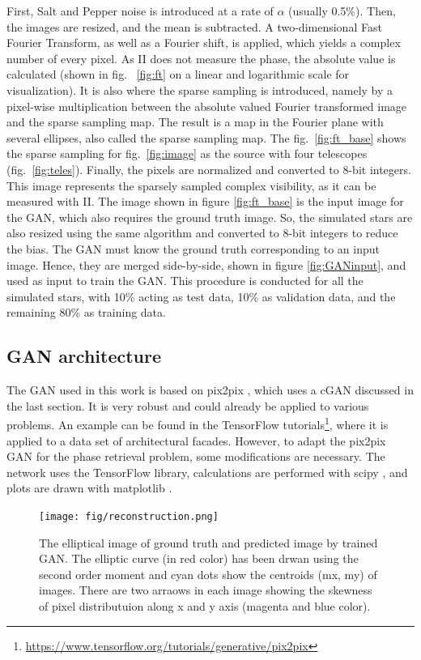 First, Salt and Pepper noise is introduced at a rate of $\alpha$ (usually 0.5\%). Then, the images are resized, and the mean is subtracted. A two-dimensional Fast Fourier Transform, as well as a Fourier shift, is applied, which yields a complex number of every pixel. As II does not measure the phase, the absolute value is calculated (shown in fig.~ \ref{fig:ft} on a linear and logarithmic scale for visualization). It is also where the sparse sampling is introduced, namely by a pixel-wise multiplication between the absolute valued Fourier transformed image and the sparse sampling map. The result is a map in the Fourier plane with several ellipses, also called the sparse sampling map. The fig.~\ref{fig:ft_base} shows the sparse sampling for fig.~\ref{fig:image} as the source with four telescopes (fig.~\ref{fig:teles}). Finally, the pixels are normalized and converted to 8-bit integers. This image represents the sparsely sampled complex visibility, as it can be measured with II. The image shown in figure \ref{fig:ft_base} is the input image for the GAN, which also requires the ground truth image. So, the simulated stars are also resized using the same algorithm and converted to 8-bit integers to reduce the bias. The GAN must know the ground truth corresponding to an input image. Hence, they are merged side-by-side, shown in figure \ref{fig:GANinput}, and used as input to train the GAN. This procedure is conducted for all the simulated stars, with 10\% acting as test data, 10\% as validation data, and the remaining 80\% as training data. 

\subsection{GAN architecture}
The GAN used in this work is based on pix2pix \cite{isola2017image}, which uses a cGAN discussed in the last section. It is very robust and could already be applied to various problems. An example can be found in the TensorFlow tutorials\footnote{\url{https://www.tensorflow.org/tutorials/generative/pix2pix}}, where it is applied to a data set of architectural facades. However, to adapt the pix2pix GAN for the phase retrieval problem, some modifications are necessary. The network uses the TensorFlow \cite{abadi2016tensorflow} library, calculations are performed with scipy \cite{virtanen2020scipy}, and plots are drawn with matplotlib \cite{4160265}.
\begin{figure}
	\texttt{[image: fig/reconstruction.png]}
	\caption{The elliptical image of ground truth and predicted image by trained GAN. The elliptic curve (in red color) has been drwan using the second order moment and cyan dots show the centroids (mx, my) of images. There are two arraows in each image showing the skewness of pixel distributuion along x and y axis (magenta and blue color).}
	\label{fig:recons}
\end{figure}
